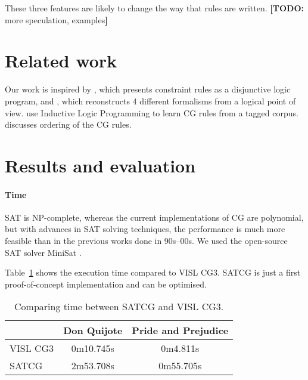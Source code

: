 \documentclass[11pt]{article}
\newcommand{\todo}[1]{{\color{cyan}\textbf{[TODO: }#1\textbf{]}}}
\begin{document}

These three features are likely to change the way that rules are written. \todo{more speculation, examples}


\section{Related work}
\label{sect:related}

Our work is inspired by \cite{lager98}, which presents constraint rules as a disjunctive logic program,
and \cite{lager_nivre01}, which reconstructs 4 different formalisms from a logical point of view.
\cite{lindberg_eineborg98ilp,asfrent14} use Inductive Logic Programming to learn CG rules from a tagged corpus.
\cite{lager01transformation} discusses ordering of the CG rules.


\section{Results and evaluation}

\paragraph{Time}

SAT is NP-complete, whereas the current implementations of CG are polynomial, 
but with advances in SAT solving techniques, 
the performance is much more feasible than in the previous works done in 90s--00s.
We used the open-source SAT solver MiniSat \cite{een04sat}.

Table~\ref{table:time} shows the execution time compared to VISL CG3.
SATCG is just a first proof-of-concept implementation and can be optimised.

\begin{table}
  \centering
  \begin{tabular}{|l|c|c|}
     \hline
	         & \textbf{Don Quijote}  & \textbf{Pride and Prejudice} \\ \hline
  VISL CG3 & 0m10.745s & 0m4.811s \\ \hline
  SATCG    & 2m53.708s & 0m55.705s \\ \hline
  \end{tabular}
  \caption{Comparing time between SATCG and VISL CG3.}
  \label{table:time}
\end{table}
\end{document}

